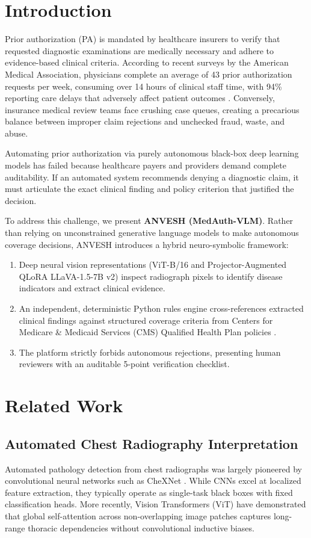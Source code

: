 \documentclass[conference]{IEEEtran}
\begin{document}
\section{Introduction}
Prior authorization (PA) is mandated by healthcare insurers to verify that requested diagnostic examinations are medically necessary and adhere to evidence-based clinical criteria. According to recent surveys by the American Medical Association, physicians complete an average of 43 prior authorization requests per week, consuming over 14 hours of clinical staff time, with 94\% reporting care delays that adversely affect patient outcomes \cite{ama2024priorauth}. Conversely, insurance medical review teams face crushing case queues, creating a precarious balance between improper claim rejections and unchecked fraud, waste, and abuse.

Automating prior authorization via purely autonomous black-box deep learning models has failed because healthcare payers and providers demand complete auditability. If an automated system recommends denying a diagnostic claim, it must articulate the exact clinical finding and policy criterion that justified the decision. 

To address this challenge, we present \textbf{ANVESH (MedAuth-VLM)}. Rather than relying on unconstrained generative language models to make autonomous coverage decisions, ANVESH introduces a hybrid neuro-symbolic framework:
\begin{enumerate}
    \item Deep neural vision representations (ViT-B/16 and Projector-Augmented QLoRA LLaVA-1.5-7B v2) inspect radiograph pixels to identify disease indicators and extract clinical evidence.
    \item An independent, deterministic Python rules engine cross-references extracted clinical findings against structured coverage criteria from Centers for Medicare \& Medicaid Services (CMS) Qualified Health Plan policies \cite{cms2024qhp}.
    \item The platform strictly forbids autonomous rejections, presenting human reviewers with an auditable 5-point verification checklist.
\end{enumerate}

\section{Related Work}
\subsection{Automated Chest Radiography Interpretation}
Automated pathology detection from chest radiographs was largely pioneered by convolutional neural networks such as CheXNet \cite{rajpurkar2017chexnet}. While CNNs excel at localized feature extraction, they typically operate as single-task black boxes with fixed classification heads. More recently, Vision Transformers (ViT) \cite{dosovitskiy2020image} have demonstrated that global self-attention across non-overlapping image patches captures long-range thoracic dependencies without convolutional inductive biases.
\end{document}
